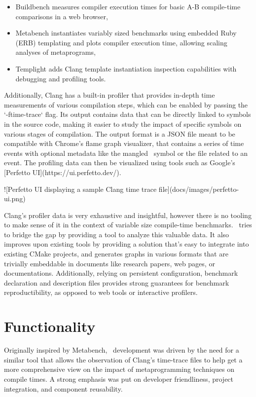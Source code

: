 \documentclass[../../main.tex]{subfiles}
\begin{document}
\begin{itemize}
\item Buildbench\cite{buildbench} measures compiler execution times for basic
      A-B compile-time comparisons in a web browser,
\item Metabench\cite{metabench} instantiates variably sized benchmarks using embedded
      Ruby (ERB) templating and plots compiler execution time, allowing scaling
      analyses of metaprograms,
\item Templight\cite{templight} adds Clang template instantiation inspection
      capabilities with debugging and profiling tools.
\end{itemize}

Additionally, Clang has a built-in profiler\cite{time-trace} that provides in-depth
time measurements of various compilation steps, which can be enabled by passing
the `-ftime-trace` flag. Its output contains data that can be directly linked to
symbols in the source code, making it easier to study the impact of specific
symbols on various stages of compilation. The output format is a JSON file meant
to be compatible with Chrome's flame graph visualizer, that contains a series of
time events with optional metadata like the mangled \cpp~symbol or the file
related to an event. The profiling data can then be visualized using tools such
as Google's [Perfetto UI](https://ui.perfetto.dev/).

![Perfetto UI displaying a sample Clang time trace file](docs/images/perfetto-ui.png)

Clang's profiler data is very exhaustive and insightful, however there is no
tooling to make sense of it in the context of variable size compile-time
benchmarks. \ctbench~tries to bridge the gap by providing a tool to analyze
this valuable data. It also improves upon existing tools by providing a solution
that's easy to integrate into existing CMake projects, and generates graphs in
various formats that are trivially embeddable in documents like research papers,
web pages, or documentations. Additionally, relying on persistent configuration,
benchmark declaration and description files provides strong guarantees for
benchmark reproductibility, as opposed to web tools or interactive profilers.

\section{Functionality}

Originally inspired by Metabench\cite{metabench}, \ctbench~development was
driven by the need for a similar tool that allows the observation of Clang's
time-trace files to help get a more comprehensive view on the impact of
metaprogramming techniques on compile times. A strong emphasis was put on
developer friendliness, project integration, and component reusability.
\end{document}
